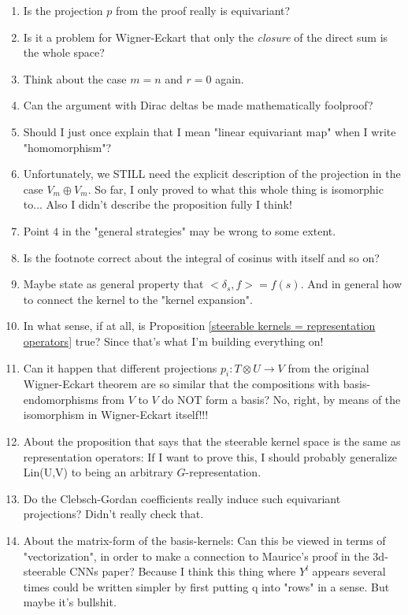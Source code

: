 \documentclass[12pt, a4paper]{article}
\theoremstyle{plain}
\theoremstyle{definition}
\theoremstyle{remark}
\begin{document}
\begin{enumerate}
\item Is the projection $p$ from the proof really is equivariant?
\item Is it a problem for Wigner-Eckart that only the \emph{closure} of the direct sum is the whole space?
\item Think about the case $m = n$ and $r = 0$ again.
\item Can the argument with Dirac deltas be made mathematically foolproof?
\item Should I just once explain that I mean "linear equivariant map" when I write "homomorphism"?
\item Unfortunately, we STILL need the explicit description of the projection in the case $V_m \oplus V_m$. So far, I only proved to what this whole thing is isomorphic to... Also I didn't describe the proposition fully I think!
\item Point $4$ in the "general strategies" may be wrong to some extent.
\item Is the footnote correct about the integral of cosinus with itself and so on?
\item Maybe state as general property that $<\delta_s, f> = f(s)$. And in general how to connect the kernel to the "kernel expansion".
\item In what sense, if at all, is Proposition \ref{steerable kernels = representation operators} true? Since that's what I'm building everything on!
\item Can it happen that different projections $p_i: T \otimes U \to V$ from the original Wigner-Eckart theorem are so similar that the compositions with basis-endomorphisms from $V$ to $V$ do NOT form a basis? No, right, by means of the isomorphism in Wigner-Eckart itself!!!
\item About the proposition that says that the steerable kernel space is the same as representation operators: If I want to prove this, I should probably generalize Lin(U,V) to being an arbitrary $G$-representation.
\item Do the Clebsch-Gordan coefficients really induce such equivariant projections? Didn't really check that.
\item About the matrix-form of the basis-kernels: Can this be viewed in terms of "vectorization", in order to make a connection to Maurice's proof in the 3d-steerable CNNs paper? Because I think this thing where $Y^l$ appears several times could be written simpler by first putting q into "rows" in a sense. But maybe it's bullshit.
\end{enumerate}









 





\end{document}
